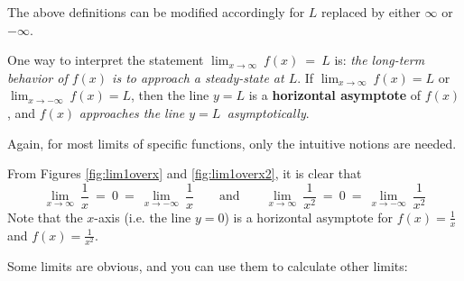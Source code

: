 
The above definitions can be modified accordingly for $L$ replaced by
either $\infty$ or $-\infty$.

One way to interpret the statement
$\displaystyle\lim_{x \to \infty} ~f(x) ~=~ L$ is: \emph{the
long-term behavior of $f(x)$ is to approach a steady-state at $L$}.
If $\displaystyle\lim_{x \to \infty} ~f(x) = L $ or
$\displaystyle\lim_{x \to -\infty} ~f(x) = L$, then the line $y=L$ is a
\textbf{horizontal asymptote} of $f(x)$,
and $f(x)$ \emph{approaches the line $y=L\,$ asymptotically}. 

Again, for most limits of specific functions, only the intuitive notions are
needed.

\begin{exmp}\label{exmp:lim1overxandx2inf}
\noindent From Figures \ref{fig:lim1overx} and \ref{fig:lim1overx2}, it is clear
that
\[
\lim_{x \to \infty}~\dfrac{1}{x} ~=~ 0 ~=~ \lim_{x \to -\infty}~\dfrac{1}{x} \qquad\text{and}\qquad
\lim_{x \to \infty}~\dfrac{1}{x^2} ~=~ 0 ~=~ \lim_{x \to -\infty}~\dfrac{1}{x^2}
\]
Note that the $x$-axis (i.e. the line $y = 0$) is a horizontal asymptote for
$f(x) = \frac{1}{x}$ and $f(x) = \frac{1}{x^2}$.
\end{exmp}
\divider
\vspace{3mm}

Some limits are obvious, and you can use them to calculate other limits:

